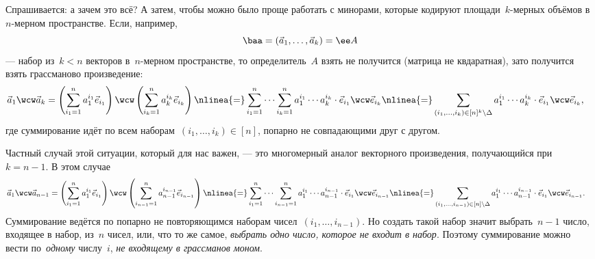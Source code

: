 Спрашивается: а зачем это всё? А затем, чтобы можно было проще работать с минорами, которые кодируют площади~$k$-мерных объёмов в~$n$-мерном пространстве. Если, например, 
\[
	\baa = (\vec{a}_1, \dots, \vec{a}_k) = \ee A
\]
--- набор из~$k < n$ векторов в~$n$-мерном пространстве, то определитель~$A$ взять не получится (матрица не квдаратная), зато получится взять грассманово произведение:
\begin{align*}
	\vec{a}_1 \wcw \vec{a}_k
	&=
	\left( 
		\sum_{i_1 = 1}^{n}
			a_1^{i_1}
			\vec{e}_{i_1}
	\right)
	\wcw
	\left( 
		\sum_{i_k = 1}^{n}
			a_k^{i_k}
			\vec{e}_{i_k}
	\right)
	\nlinea{=}
	\sum_{i_1 = 1}^{n}
	\cdots
	\sum_{i_k = 1}^{n}
		a_1^{i_1}
		\cdots
		a_k^{i_k}
	\cdot
		\vec{e}_{i_1}
		\wcw
		\vec{e}_{i_k}
	\nlinea{=}
	\sum_{(i_1, \dots, i_k) \in [n]^k \setminus \Delta}
		a_1^{i_1}
		\cdots
		a_k^{i_k}
	\cdot
		\vec{e}_{i_1}
		\wcw
		\vec{e}_{i_k}
	,
\end{align*}
где суммирование идёт по всем наборам~$(i_1, \dots, i_k) \in [n]$, попарно не совпадающими друг с другом.

Частный случай этой ситуации, который для нас важен, --- это многомерный аналог векторного произведения, получающийся при~$k = n-1$. В этом случае
\begin{align*}
	\vec{a}_1 \wcw \vec{a}_{n-1}
	&=
	\left( 
		\sum_{i_1 = 1}^{n}
			a_1^{i_1}
			\vec{e}_{i_1}
	\right)
	\wcw
	\left( 
		\sum_{i_{n-1} = 1}^{n}
			a_{n-1}^{i_{n-1}}
			\vec{e}_{i_{n-1}}
	\right)
	\nlinea{=}
	\sum_{i_1 = 1}^{n}
	\cdots
	\sum_{i_{n-1} = 1}^{n}
		a_1^{i_1}
		\cdots
		a_{n-1}^{i_{n-1}}
	\cdot
		\vec{e}_{i_1}
		\wcw
		\vec{e}_{i_{n-1}}
	\nlinea{=}
	\sum_{(i_1, \dots, i_{n-1}) \in [n] \setminus \Delta}
		a_1^{i_1}
		\cdots
		a_{n-1}^{i_{n-1}}
	\cdot
		\vec{e}_{i_1}
		\wcw
		\vec{e}_{i_{n-1}}
	.
\end{align*}
Суммирование ведётся по попарно не повторяющимся наборам чисел~$(i_1, \dots, i_{n-1})$. Но создать такой набор значит выбрать~$n-1$ число, входящее в набор, из~$n$ чисел, или, что то же самое, \emph{выбрать одно число, которое не входит в набор}. Поэтому суммирование можно вести по~\emph{одному} числу~$i$, \emph{не входящему в грассманов моном}.
\sloppy

